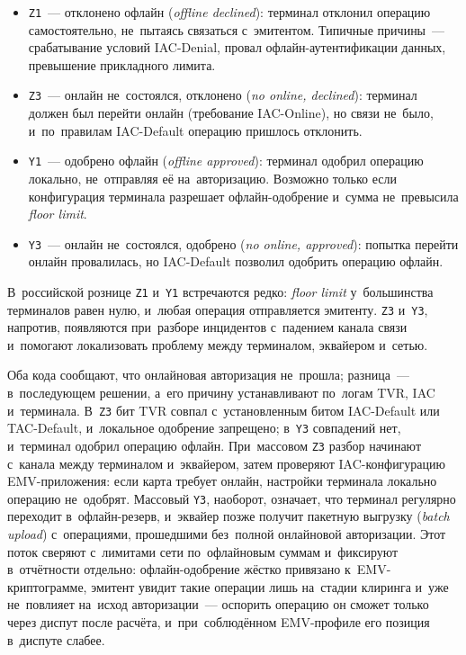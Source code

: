 \begin{itemize}
  \item \texttt{Z1}~--- отклонено офлайн (\textit{offline declined}): терминал
    отклонил операцию самостоятельно, не~пытаясь связаться с~эмитентом.
    Типичные причины~--- срабатывание условий IAC-Denial, провал офлайн-аутентификации
    данных, превышение прикладного лимита.
  \item \texttt{Z3}~--- онлайн не~состоялся, отклонено (\textit{no online,
    declined}): терминал должен был перейти онлайн (требование IAC-Online),
    но связи не~было, и~по~правилам IAC-Default операцию пришлось отклонить.
  \item \texttt{Y1}~--- одобрено офлайн (\textit{offline approved}): терминал
    одобрил операцию локально, не~отправляя её на~авторизацию. Возможно только
    если конфигурация терминала разрешает офлайн-одобрение и~сумма не~превысила
    \textit{floor limit}.
  \item \texttt{Y3}~--- онлайн не~состоялся, одобрено (\textit{no online,
    approved}): попытка перейти онлайн провалилась, но IAC-Default позволил
    одобрить операцию офлайн.
\end{itemize}

В~российской рознице \texttt{Z1} и~\texttt{Y1} встречаются редко: \textit{floor
limit} у~большинства терминалов равен нулю, и~любая операция отправляется
эмитенту.
\texttt{Z3} и~\texttt{Y3}, напротив, появляются при~разборе инцидентов
с~падением канала связи и~помогают локализовать проблему между терминалом,
эквайером и~сетью.

Оба кода сообщают, что онлайновая авторизация не~прошла; разница~---
в~последующем решении, а~его причину устанавливают по~логам TVR, IAC
и~терминала. В~\texttt{Z3} бит TVR совпал с~установленным битом IAC-Default
или TAC-Default, и~локальное одобрение запрещено; в~\texttt{Y3} совпадений
нет, и~терминал одобрил операцию офлайн. При~массовом \texttt{Z3} разбор
начинают с~канала между терминалом и~эквайером, затем проверяют
IAC-конфигурацию EMV-приложения: если карта требует онлайн, настройки терминала
локально операцию не~одобрят. Массовый \texttt{Y3}, наоборот, означает, что
терминал регулярно переходит в~офлайн-резерв, и~эквайер
позже получит пакетную выгрузку (\textit{batch upload}) с~операциями, прошедшими без~полной
онлайновой авторизации. Этот поток сверяют с~лимитами сети по~офлайновым
суммам и~фиксируют в~отчётности отдельно: офлайн-одобрение жёстко привязано
к~EMV-криптограмме, эмитент увидит такие операции лишь на~стадии клиринга и~уже
не~повлияет на~исход авторизации~--- оспорить операцию он сможет только через
диспут после расчёта, и~при~соблюдённом EMV-профиле его позиция в~диспуте
слабее.

